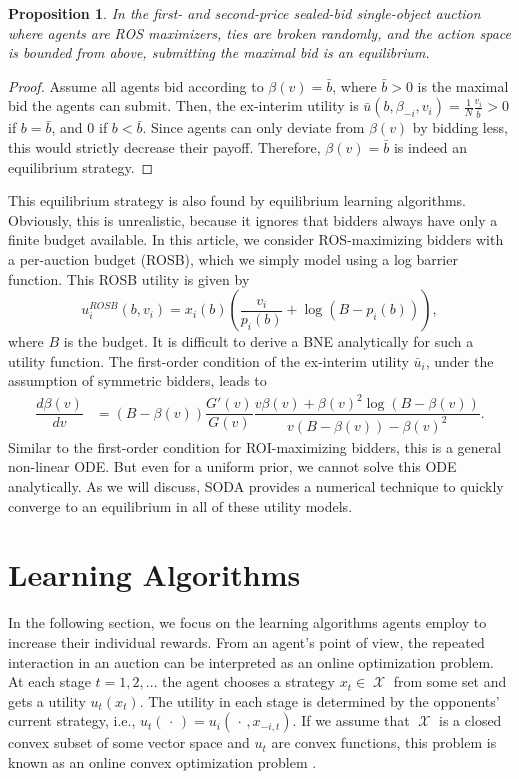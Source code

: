 \documentclass{article}
\newtheorem{proposition}{Proposition}[section]
\DeclareMathOperator{\Xcal}{\mathcal{X}}
\begin{document}
\begin{proposition}
	In the first- and second-price sealed-bid single-object auction where agents are ROS maximizers, ties are broken randomly, and the action space is bounded from above, submitting the maximal bid is an equilibrium.
\end{proposition}
\begin{proof}
Assume all agents bid according to $\beta(v) = \bar b$, where $\bar b > 0$ is the maximal bid the agents can submit. Then, the ex-interim utility is $\bar u(b,\beta_{-i}, v_i) = \tfrac{1}{N} \tfrac{v_i}{\bar b} > 0$ if $b = \bar b$, and $0$ if $b < \bar b$. Since agents can only deviate from $\beta(v)$ by bidding less, this would strictly decrease their payoff. Therefore, $\beta(v) = \bar b$ is indeed an equilibrium strategy.
\end{proof}

This equilibrium strategy is also found by equilibrium learning algorithms. Obviously, this is unrealistic, because it ignores that bidders always have only a finite budget available.  
In this article, we consider ROS-maximizing bidders with a per-auction budget (ROSB), which we simply model using a log barrier function. This ROSB utility is given by
\begin{equation}
	u_i^{ROSB}(b, v_i) = x_i(b) \left( \dfrac{v_i}{p_i(b)} + \log(B - p_i(b)) \right),
\end{equation}
where $B$ is the budget. It is difficult to derive a BNE analytically for such a utility function. The first-order condition of the ex-interim utility $\bar u_i $, under the assumption of symmetric bidders, leads to
\begin{align}
	\label{eq:foc_rosb}
	\dfrac{d \beta(v)}{dv} &= (B-\beta(v))\dfrac{G'(v)}{G(v)} \dfrac{v\beta(v) + \beta(v)^2\log(B-\beta(v))}{v(B-\beta(v))-\beta(v)^2}.
\end{align}
Similar to the first-order condition for ROI-maximizing bidders, this is a general non-linear ODE. But even for a uniform prior, we cannot solve this ODE analytically. 
As we will discuss, SODA provides a numerical technique to quickly converge to an equilibrium in all of these utility models. 

\section{Learning Algorithms}
In the following section, we focus on the learning algorithms agents employ to increase their individual rewards. 
From an agent's point of view, the repeated interaction in an auction can be interpreted as an online optimization problem. 
At each stage $t = 1,2,\dots$ the agent chooses a strategy $x_t \in \Xcal $ from some set and gets a utility $u_t(x_t)$. 
The utility in each stage is determined by the opponents' current strategy, i.e., $u_t(\,\cdot\,) = u_i(\,\cdot\,, x_{-i,t})$. 
If we assume that $\Xcal$ is a closed convex subset of some vector space and $u_t$ are convex functions, this problem is known as an online convex optimization problem \citep{shalev-shwartzOnlineLearningOnline2011}.
\end{document}

